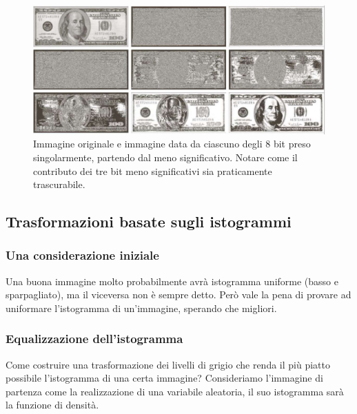 \documentclass[a4paper,11pt]{article}
\begin{document}
\newpage
\renewcommand{\thefigure}{5.14}
\begin{figure}[!h]
  \centering
    \includegraphics[scale=0.4]{images/5/bitplane_slicing.png}
    \caption{Immagine originale e immagine data da ciascuno degli 8 bit preso singolarmente, partendo dal meno significativo. Notare come il contributo dei tre bit meno significativi sia praticamente trascurabile.}
\end{figure}

\subsection{Trasformazioni basate sugli istogrammi}

\subsubsection{Una considerazione iniziale}
Una buona immagine molto probabilmente avrà istogramma uniforme (basso e sparpagliato), ma il viceversa non è sempre detto. Però vale la pena di provare ad uniformare l'istogramma di un'immagine,
sperando che migliori.
\subsubsection{Equalizzazione dell'istogramma}
Come costruire una trasformazione dei livelli di grigio che renda il più piatto possibile l'istogramma di una certa immagine?
Consideriamo l'immagine di partenza come la realizzazione di una variabile aleatoria, il suo istogramma sarà la funzione di densità.
\end{document}
